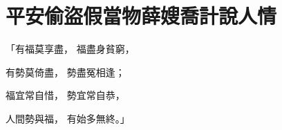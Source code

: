 %

\chapter{平安偷盜假當物\KG 薛嫂喬計說人情}


\begin{showcontents}{}



「有福莫享盡，  福盡身貧窮，

有勢莫倚盡，  勢盡冤相逢；

福宜常自惜，  勢宜常自恭，

人間勢與福，  有始多無終。」


\end{showcontents}
